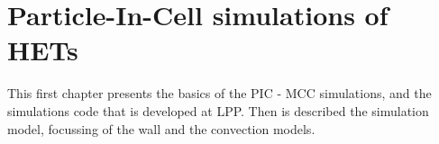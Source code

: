 
\chapter{Particle-In-Cell simulations of HETs}
\label{ch-1}

% 
% 
% 


This first chapter presents the basics of the \ac{PIC} - \ac{MCC} simulations, and the simulations code \LPPic that is developed at \ac{LPP}.
Then is described the simulation model, focussing of the wall and the convection models.

\minitoc


 









